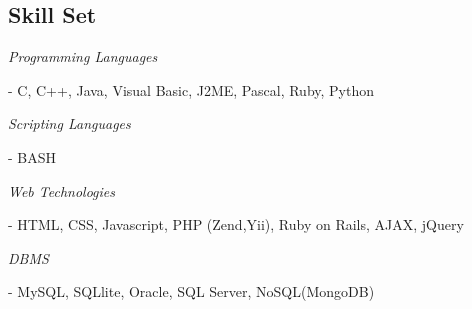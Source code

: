 \begin{resume}
		\section{\sc Skill Set}
			\begin{list1}
				\item[] \emph{Programming Languages}
				\begin{list2}
					\item[-] C, C++, Java, Visual Basic, J2ME, Pascal, Ruby, Python
				\end{list2}
				\item[] \emph{Scripting Languages}
				\begin{list2}
					\item[-] BASH
				\end{list2}
				\item[] \emph{Web Technologies}
				\begin{list2}
					\item[-] HTML, CSS, Javascript, PHP (Zend,Yii), Ruby on Rails, AJAX, jQuery
				\end{list2}
				\item[] \emph{DBMS}
				\begin{list2}
					\item[-] MySQL, SQLlite, Oracle, SQL Server, NoSQL(MongoDB)
				\end{list2}
			\end{list1}
	\end{resume}
